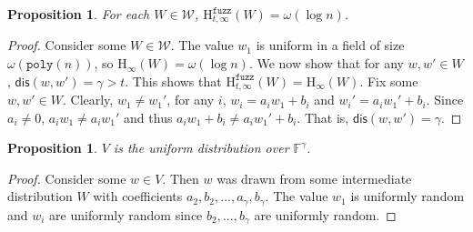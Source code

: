 \documentclass[11pt]{article}
\newcommand{\dis}{\ensuremath{\mathsf{dis}}}
\newcommand{\poly}{\ensuremath{\mathtt{poly}}\xspace}
\newcommand{\Hoo}{\mathrm{H}_\infty}
\newcommand{\Hfuzz}{\mathrm{H}^{\mathtt{fuzz}}_{t,\infty}}
\newtheorem{proposition}[theorem]{Proposition}
\begin{document}
\begin{proposition} 
\label{prop:each element good} For each $W\in\mathcal{W}$, $\Hfuzz(W) = \omega(\log n)$.
\end{proposition}
\begin{proof}
Consider some $W\in\mathcal{W}$.  The value $w_1$ is uniform in a field of size $\omega(\poly(n))$, so $\Hoo(W) =\omega(\log n)$.  We now show that for any $w, w'\in W$, $\dis(w, w') = \gamma>t$.  This shows that $\Hfuzz(W) = \Hoo(W)$.  Fix some $w, w'\in W$.  Clearly, $w_1 \neq w_1'$, for any $i$, $w_i = a_i w_1 + b_i$ and $w_i' = a_i w_1' + b_i$.  Since $a_i\neq 0$, $a_iw_1 \neq a_iw_1'$ and thus $a_iw_1+b_i \neq a_iw_1'+b_i$.  That is, $\dis (w, w')  =\gamma$.
\end{proof}

\begin{proposition}
\label{prop:distribution uniform} $V$ is the uniform distribution over $\mathbb{F}^\gamma$.
\end{proposition}
\begin{proof}
Consider some $w\in V$.  Then $w$ was drawn from some intermediate distribution $W$ with coefficients $a_2, b_2, ..., a_\gamma , b_\gamma$.  The value $w_1$ is uniformly random and $w_i$ are uniformly random since $b_2,..., b_\gamma$ are uniformly random.
\end{proof}
\end{document}
